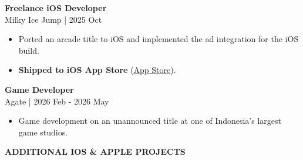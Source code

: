 \documentclass[11pt,a4paper]{article}
\newcommand{\jobentry}[2]{%
    \textbf{#1}\\
    {\small\color{lighttext}#2}\\[4pt]%
}
\begin{document}
\begin{minipage}[t]{14cm}
\begin{minipage}[t]{12.5cm}
\jobentry{Freelance iOS Developer}{Milky Ice Jump | 2025 Oct}
\begin{itemize}[leftmargin=*, nosep, itemsep=2pt, topsep=2pt]
    \item Ported an arcade title to iOS and implemented the ad integration for the iOS build.
    \item \textbf{Shipped to iOS App Store} (\href{https://apps.apple.com/id/app/milky-ice-jump/id6751799679}{\color{accent}\underline{App Store}}).
\end{itemize}

\vspace{0.4cm}

\jobentry{Game Developer}{Agate | 2026 Feb - 2026 May}
\begin{itemize}[leftmargin=*, nosep, itemsep=2pt, topsep=2pt]
    \item Game development on an unannounced title at one of Indonesia's largest game studios.
\end{itemize}

\end{minipage}
\end{minipage}

\newpage


\vspace{1.2cm}

\begin{center}
{\large\bfseries\MakeUppercase{Additional iOS \& Apple Projects}}
\end{center}

\vspace{0.5cm}
\end{document}
